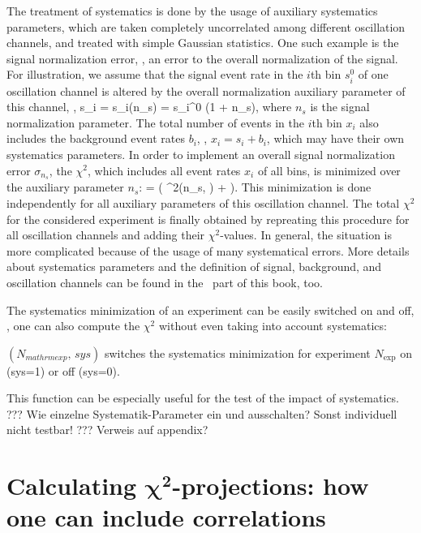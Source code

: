 The treatment of systematics is done by the usage of auxiliary systematics parameters, which are taken completely uncorrelated among different oscillation channels, and treated with simple Gaussian statistics. One such example is the signal normalization error, \ie, an error to the overall normalization of the signal. For illustration, we assume that the signal event rate in the $i$th bin $s_i^0$ of one oscillation channel is altered by the overall normalization auxiliary parameter of this channel, \ie , 
\be
 s_i = s_i(n_s) = s_i^0 \cdot (1 + n_s),
\ee
where $n_s$ is the signal normalization parameter. The total number of events in the $i$th bin $x_i$ also includes the background event rates $b_i$, \ie, $x_i = s_i + b_i$, which may have their own systematics parameters.
In order to implement an overall signal normalization error $\sigma_{n_s}$,  the $\chi^2$, which includes all event rates $x_i$ of all bins, is minimized over the auxiliary parameter $n_s$:
\be
  =  \left(  \chi^2(n_s, \hdots) +  \right).
\ee 
This minimization is done independently for all auxiliary parameters of this oscillation channel. The total $\chi^2$ for the considered experiment is finally obtained by repreating this procedure for all oscillation channels and adding their $\chi^2$-values. In general, the situation is more complicated because of the usage of many systematical errors. More details about systematics parameters and the definition of signal, background, and oscillation channels can be found in the \EDM\ part of this book, too.

The systematics minimization of an experiment can be easily switched on and off, \ie, one can also compute the $\chi^2$ without even taking into account systematics:
\begin{function}
$(N_{mathrm{exp}}, \, sys)$ switches the systematics minimization for experiment $N_{\mathrm{exp}}$ on (sys=1) or off (sys=0).
\end{function}
This function can be especially useful for the test of the impact of systematics.
??? Wie einzelne Systematik-Parameter ein und ausschalten? Sonst individuell nicht testbar! ??? Verweis auf appendix? 

\chapter[Calculating $\chi^2$-projections: how one can include correlations]{Calculating $\boldsymbol{\chi^2}$-projections: how one can include correlations}


